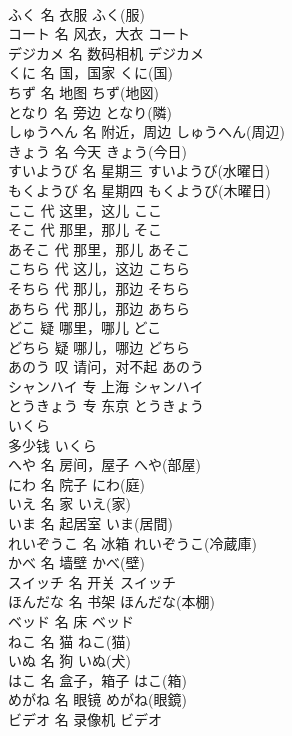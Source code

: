 \documentclass[8pt]{extreport}
\begin{document}
\begin{CJK}{UTF8}{min}
\\	ふく	名	衣服	ふく(服)	
\\	コート	名	风衣，大衣	コート	
\\	デジカメ	名	数码相机	デジカメ	
\\	くに	名	国，国家	くに(国)	
\\	ちず	名	地图	ちず(地図)	
\\	となり	名	旁边	となり(隣)	
\\	しゅうへん	名	附近，周边	しゅうへん(周辺)	
\\	きょう	名	今天	きょう(今日)	
\\	すいようび	名	星期三	すいようび(水曜日)	
\\	もくようび	名	星期四	もくようび(木曜日)	
\\	ここ	代	这里，这儿	ここ	
\\	そこ	代	那里，那儿	そこ	
\\	あそこ	代	那里，那儿	あそこ	
\\	こちら	代	这儿，这边	こちら	
\\	そちら	代	那儿，那边	そちら	
\\	あちら	代	那儿，那边	あちら	
\\	どこ	疑	哪里，哪儿	どこ	
\\	どちら	疑	哪儿，哪边	どちら	
\\	あのう	叹	请问，对不起	あのう	
\\	シャンハイ	专	上海	シャンハイ	
\\	とうきょう	专	东京	とうきょう	
\\	いくら	
\\	多少钱	いくら	
\\	へや	名	房间，屋子	へや(部屋)	
\\	にわ	名	院子	にわ(庭)	
\\	いえ	名	家	いえ(家)	
\\	いま	名	起居室	いま(居間)	
\\	れいぞうこ	名	冰箱	れいぞうこ(冷蔵庫)	
\\	かべ	名	墙壁	かべ(壁)	
\\	スイッチ	名	开关	スイッチ	
\\	ほんだな	名	书架	ほんだな(本棚)	
\\	ベッド	名	床	ベッド	
\\	ねこ	名	猫	ねこ(猫)	
\\	いぬ	名	狗	いぬ(犬)	
\\	はこ	名	盒子，箱子	はこ(箱)	
\\	めがね	名	眼镜	めがね(眼鏡)	
\\	ビデオ	名	录像机	ビデオ	

\end{CJK}
\end{document}

